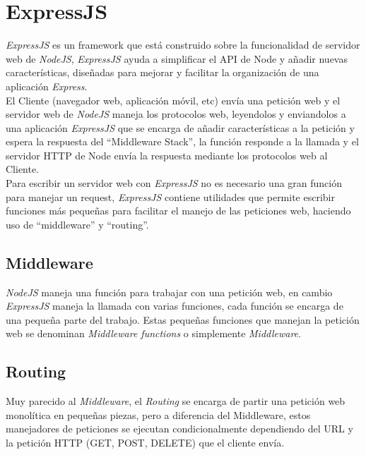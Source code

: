 \section{ExpressJS}
\label{sec:express_js}
  \emph{ExpressJS} es un framework que está construido sobre la funcionalidad de servidor web de \emph{NodeJS}, \emph{ExpressJS} ayuda a simplificar el API de Node y añadir nuevas características, diseñadas para mejorar y facilitar la organización de una aplicación \emph{Express}.\\

  El Cliente (navegador web, aplicación móvil, etc) envía una petición web y el servidor web de \emph{NodeJS} maneja los protocolos web, leyendolos y enviandolos a una aplicación \emph{ExpressJS} que se encarga de añadir características a la petición y espera la respuesta del ``Middleware Stack'', la función responde a la llamada y el servidor HTTP de Node envía la respuesta mediante los protocolos web al Cliente.\\

  Para escribir un servidor web con \emph{ExpressJS}  no es necesario una gran función para manejar un request, \emph{ExpressJS} contiene utilidades que permite escribir funciones más pequeñas para facilitar el manejo de las peticiones web, haciendo uso de ``middleware'' y ``routing''.

  \subsection{Middleware}
  \label{sub:middleware}
    \emph{NodeJS} maneja una función para trabajar con una petición web, en cambio \emph{ExpressJS} maneja la llamada con varias funciones, cada función se encarga de una pequeña parte del trabajo. Estas pequeñas funciones que manejan la petición web se denominan \emph{Middleware functions} o simplemente \emph{Middleware}.


  \subsection{Routing}
  \label{sub:routing}
    Muy parecido al \emph{Middleware}, el \emph{Routing} se encarga de partir una petición web monolítica en pequeñas piezas, pero a diferencia del Middleware, estos manejadores de peticiones se ejecutan condicionalmente dependiendo del URL y la petición HTTP (GET, POST, DELETE) que el cliente envía.\\

